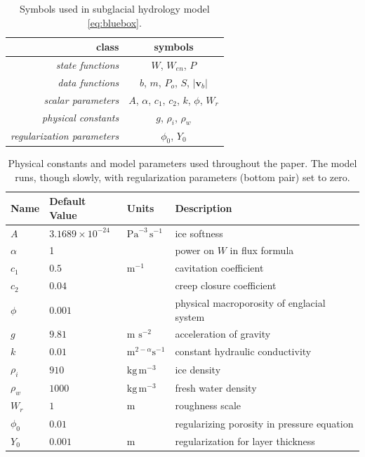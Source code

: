 \documentclass[11pt,final]{amsart}
\newcommand\bv{\mathbf{v}}
\begin{document}
\begin{table}[ht]
\caption{Symbols used in subglacial hydrology model \eqref{eq:bluebox}.}
\begin{tabular}{r|c}
class & symbols \\ \hline
\emph{state functions} & $W$, $W_{en}$, $P$ \\
\emph{data functions} & $b$, $m$, $P_o$, $S$, $|\bv_b|$ \\
\emph{scalar parameters} & $A$, $\alpha$, $c_1$, $c_2$, $k$, $\phi$, $W_r$ \\
\emph{physical constants} & $g$, $\rho_i$, $\rho_w$ \\
\emph{regularization parameters} & $\phi_0$, $Y_0$ \\
\hline
\end{tabular}
\label{tab:symbols}
\end{table}

\begin{table}[ht]
  \centering
  \caption{Physical constants and model parameters used throughout the paper.  The model runs, though slowly, with regularization parameters (bottom pair) set to zero.}
  \begin{tabular}{lllp{3.0in}} 
    \textbf{Name} & \textbf{Default Value} & \textbf{Units} & \textbf{Description}\\
\hline
    $A$ & $3.1689\times 10^{-24}$ & $\text{Pa}^{-3}\,\text{s}^{-1}$ & ice softness \citep{EISMINT96} \phantom{$\Big|$} \\
    $\alpha$ & 1 & & power on $W$ in flux formula \\
    $c_1$ & $0.5$ & $\text{m}^{-1}$ & cavitation coefficient \\
    $c_2$ & $0.04$ & & creep closure coefficient \\
    $\phi$ & $0.001$ & & physical macroporosity of englacial system \\
    $g$ & $9.81$ & m $\text{s}^{-2}$ & acceleration of gravity \\
    $k$ & $0.01$ & $\text{m}^{2-\alpha} \text{s}^{-1}$ & constant hydraulic conductivity  \\
    $\rho_i$ & $910$ & $\text{kg}\,\text{m}^{-3}$ & ice density \citep{GreveBlatter2009} \\
    $\rho_w$ & $1000$ & $\text{kg}\,\text{m}^{-3}$ & fresh water density \citep{GreveBlatter2009} \\
    $W_r$ & $1$ & $\text{m}$ & roughness scale \\
    \hline
    $\phi_0$ & $0.01$ & & regularizing porosity in pressure equation \\
    $Y_0$ & $0.001$ & m & regularization for layer thickness \\
    \hline
  \end{tabular}
 \label{tab:constants}
\end{table}
\end{document}
